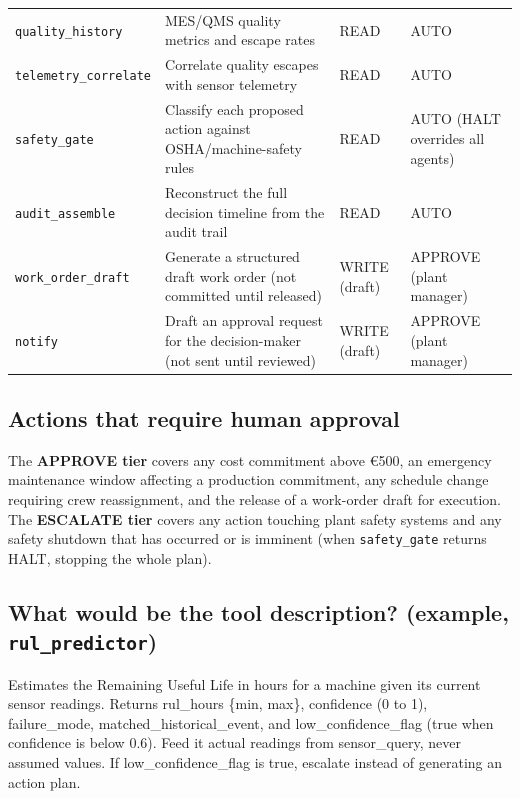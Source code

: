 \documentclass[11pt,a4paper]{article}
\let\oldsubsection\subsection
\renewcommand{\subsection}{\needspace{5\baselineskip}\oldsubsection}
\newcommand{\tool}[1]{\texttt{#1}}
\begin{document}
\begin{longtable}{>{\raggedright\arraybackslash}p{3.3cm} >{\raggedright\arraybackslash}p{6.4cm} >{\raggedright\arraybackslash}p{1.7cm} >{\raggedright\arraybackslash}p{2.9cm}}
\tool{quality\_history} & MES/QMS quality metrics and escape rates & READ & AUTO \\
\tool{telemetry\_correlate} & Correlate quality escapes with sensor telemetry & READ & AUTO \\
\tool{safety\_gate} & Classify each proposed action against OSHA/machine-safety rules & READ & AUTO (HALT overrides all agents) \\
\tool{audit\_assemble} & Reconstruct the full decision timeline from the audit trail & READ & AUTO \\
\tool{work\_order\_draft} & Generate a structured draft work order (not committed until released) & WRITE (draft) & APPROVE (plant manager) \\
\tool{notify} & Draft an approval request for the decision-maker (not sent until reviewed) & WRITE (draft) & APPROVE (plant manager) \\
\end{longtable}
\normalsize

\subsection*{Actions that require human approval}
The \textbf{APPROVE tier} covers any cost commitment above \euro{}500, an emergency maintenance window affecting a production commitment, any schedule change requiring crew reassignment, and the release of a work-order draft for execution. The \textbf{ESCALATE tier} covers any action touching plant safety systems and any safety shutdown that has occurred or is imminent (when \tool{safety\_gate} returns HALT, stopping the whole plan).

\subsection*{What would be the tool description? (example, \tool{rul\_predictor})}
\begin{promptbox}
Estimates the Remaining Useful Life in hours for a machine given its current sensor readings. Returns rul\_hours \{min, max\}, confidence (0 to 1), failure\_mode, matched\_historical\_event, and low\_confidence\_flag (true when confidence is below 0.6). Feed it actual readings from sensor\_query, never assumed values. If low\_confidence\_flag is true, escalate instead of generating an action plan.
\end{promptbox}

\end{document}
